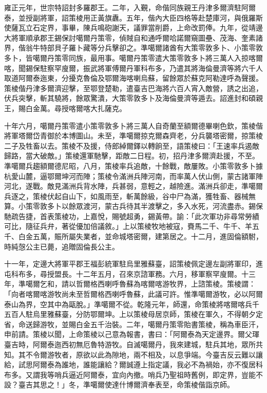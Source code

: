 \begin{pinyinscope}
雍正元年，世宗特詔封多羅郡王。二年，入覲，命偕同族親王丹津多爾濟駐阿爾泰，並授副將軍，詔策棱用正黃旗纛。五年，偕內大臣四格等赴楚庫河，與俄羅斯使薩瓦立石定界，事畢，陳兵鳴砲謝天，議罪當削爵，上命改罰俸。九年，從靖邊大將軍順承郡王錫保討噶爾丹策零，偵賊自和通呼爾哈諾爾窺圖壘、茂海、奎素諸界，偕翁牛特部貝子羅卜藏等分兵擊卻之。準噶爾諸酋有大策零敦多卜、小策零敦多卜，皆噶爾丹策零同族，最用事。噶爾丹策零遣大策零敦多卜將三萬人入掠喀爾喀，聞錫保駐察罕廋爾，振武將軍傅爾丹軍科布多，乃遣其將海倫曼濟等將六千人取道阿爾泰迤東，分擾克魯倫及鄂爾海喀喇烏蘇，留餘眾於蘇克阿勒達呼為聲援。策棱偕丹津多爾濟迎擊，至鄂登楚勒，遣臺吉巴海將六百人宵入敵營，誘之出追，伏兵突擊，斬其驍將，餘眾驚潰，大策零敦多卜及海倫曼濟等遁去。詔進封和碩親王，賜白金萬。尋授喀爾喀大扎薩克。

十年六月，噶爾丹策零遣小策零敦多卜將三萬人自奇蘭至額爾德畢喇色欽，策棱偕將軍塔爾岱青御於本博圖山。未至，準噶爾掠克爾森齊老，分兵襲塔密爾，掠策棱二子及牲畜以去。策棱不及援，侍郎綽爾鐸以轉餉至，語策棱曰：「王速率兵遏敵歸路，當大破敵。」策棱還軍馳擊，距敵二日程。初，招丹津多爾濟赴援，不至。準噶爾兵趨額爾德尼昭，八月，策棱率兵追敵，十餘戰，敵屢敗。小策零敦多卜據杭愛山麓，逼鄂爾坤河而陣；策棱令滿洲兵陣河南，而率萬人伏山側，蒙古諸軍陣河北，遂戰。敵見滿洲兵背水陣，兵甚弱，意輕之，越險進。滿洲兵卻走，準噶爾兵逐之，策棱伏起自山下，如風雨至，斬萬餘級，谷中尸為滿，獲牲畜、器械無算。小策零敦多卜以餘眾渡河，蒙古兵待其半渡擊之，多入水死，河流盡赤。錫保馳疏告捷，首表策棱功，上嘉悅，賜號超勇，錫黃帶。諭：「此次軍功非尋常勞績可比，隨征兵弁，著從優加倍議敘。」上以策棱牧地被寇，賚馬二千、牛千、羊五千、白金五萬，賑所屬失業者，並命城塔密爾，建第居之。十二月，進固倫額駙，時純愨公主已薨，追贈固倫長公主。

十一年，定邊大將軍平郡王福彭統軍駐烏里雅蘇臺，詔策棱佩定邊左副將軍印，進屯科布多，尋授盟長。十二年五月，召來京諮軍務。六月，移軍察罕廋爾。十三年，準噶爾乞和，請以哲爾格西喇呼魯蘇為喀爾喀游牧界，上諮策棱。策棱謂：「向者喀爾喀游牧尚未至哲爾格西喇呼魯蘇，此議可許。惟準噶爾游牧，必以阿爾泰山為界，空其中為甌脫。」準噶爾不從。乾隆元年，師還，命策棱將喀爾喀兵千五百人駐烏里雅蘇臺，分防鄂爾坤。上以策棱母居京師，策棱在軍久，不得朝夕定省，命送歸游牧，並賜白金五千治裝。二年，噶爾丹策零貽書策棱，稱為車臣汗，申前請。策棱以聞，上命策棱以己意為報書，書曰：「阿爾泰為天定邊界。爾父琿臺吉時，阿爾泰迤西初無厄魯特游牧。自滅噶爾丹，我來建城，駐兵其地，眾所共知。其不令爾游牧者，原欲以此為隙地，兩不相及，以息爭端。今臺吉反云難以讓給，試思阿爾泰為誰地，誰能讓給？爾誠遵上指定議，我必不為禍始，亦不復居科布多。又謂我等哨兵逼近阿爾泰，宜向內撤。哨兵乃聖祖時舊例，即定界，豈能不設？臺吉其思之！」冬，準噶爾使達什博爾濟奉表至，命策棱偕詣京師。


\end{pinyinscope}
